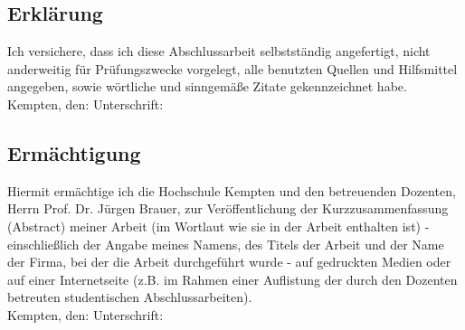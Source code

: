 
%


\subsection{Erklärung}



Ich versichere, dass ich diese Abschlussarbeit selbstständig angefertigt, nicht anderweitig für Prüfungszwecke vorgelegt, alle benutzten Quellen und Hilfsmittel angegeben, sowie wörtliche und sinngemäße Zitate gekennzeichnet habe.
\\[2.5cm]

Kempten, den:  \hrulefill\enspace\enspace\enspace  Unterschrift:  \hrulefill
\\[2.5cm]

%

\subsection{Ermächtigung}
\label{Ermächtigung}
%

Hiermit ermächtige ich die Hochschule Kempten und den betreuenden Dozenten, Herrn Prof. Dr. Jürgen Brauer, zur Veröffentlichung der Kurzzusammenfassung (Abstract) meiner Arbeit (im Wortlaut wie sie in der Arbeit enthalten ist) - einschließlich der Angabe meines Namens, des Titels der Arbeit und der Name der Firma, bei der die Arbeit durchgeführt wurde - auf gedruckten Medien oder auf einer Internetseite (z.B. im Rahmen einer Auflistung der durch den Dozenten betreuten studentischen Abschlussarbeiten).
\\[2.5cm]

Kempten, den:  \hrulefill\enspace\enspace  Unterschrift:  \hrulefill

%
